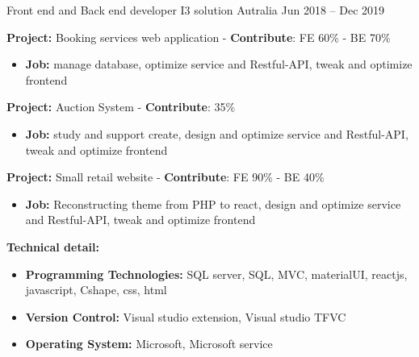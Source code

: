 \begin{cventries}
\cventry
    {Front end and Back end developer} %
    {I3 solution Autralia} %
    {} %
    {Jun 2018 – Dec 2019} %
    {
      \begin{cvitems} %
        \item {\textbf{Project:} Booking services  web application - \textbf{Contribute}: FE 60\% - BE 70\%}
        \begin{itemize}
            \item {\textbf{Job:} manage database, optimize service and Restful-API, tweak and optimize frontend}
        \end{itemize}
        \item {\textbf{Project:} Auction System - \textbf{Contribute}: 35\%}
        \begin{itemize}
            \item {\textbf{Job:} study and support create, design and optimize service and Restful-API, tweak and optimize frontend}
        \end{itemize}
        \item {\textbf{Project:} Small retail website - \textbf{Contribute}: FE 90\% - BE 40\%}
        \begin{itemize}
            \item {\textbf{Job:} Reconstructing theme from PHP to react, design and optimize service and Restful-API, tweak and optimize frontend}
        \end{itemize}
        \item {\textbf{Technical detail:}}
        \begin{itemize}
            \item {\textbf{Programming Technologies:} SQL server, SQL, MVC, materialUI, reactjs, javascript, Cshape, css, html}
            \item {\textbf{Version Control:} Visual studio extension, Visual studio TFVC}
            \item {\textbf{Operating System:} Microsoft, Microsoft service}
        \end{itemize}
      \end{cvitems}
    }

\end{cventries}
